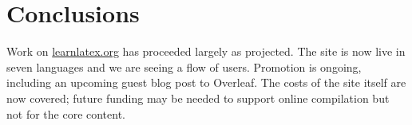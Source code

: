 \documentclass[a4paper]{article}
\begin{document}
\section{Conclusions}

Work on \url{learnlatex.org} has proceeded largely as projected. The site is
now live in seven languages and we are seeing a flow of users. Promotion is
ongoing, including an upcoming guest blog post to Overleaf. The costs of the
site itself are now covered; future funding may be needed to support online
compilation but not for the core content.
\end{document}

